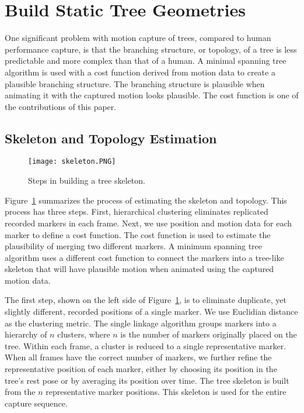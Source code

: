 \section{Build Static Tree Geometries} 

One significant problem with motion capture of trees, compared to human performance capture, is that the branching structure, or topology, of a tree is less predictable and more complex than that of a human.  A minimal spanning tree algorithm is used with a cost function derived from motion data to create a plausible branching structure.  The branching structure is plausible when animating it with the captured motion looks plausible. The cost function is one of the contributions of this paper.  

\subsection{Skeleton and Topology Estimation} 

\begin{figure}[tb]
\centering
\texttt{[image: skeleton.PNG]}
\caption{Steps in building a tree skeleton.}
\label{fig:Skeleton} 
\end{figure}

Figure~\ref{fig:Skeleton} summarizes the process of estimating the skeleton and topology. This process has three steps. First, hierarchical clustering eliminates replicated recorded markers in each frame. Next, we use position and motion data for each marker to define a cost function.  The cost function is used to estimate the plausibility of merging two different markers. A minimum spanning tree algorithm uses a different cost function to connect the markers into a tree-like skeleton that will have plausible motion when animated using the captured motion data.

The first step, shown on the left side of Figure~\ref{fig:Skeleton}, is to eliminate duplicate, yet slightly different, recorded positions of a single marker.  We use Euclidian distance as the clustering metric. The single linkage algorithm groups markers into a hierarchy of $n$ clusters, where $n$ is the number of markers originally placed on the tree.  Within each frame, a cluster is reduced to a single representative marker.  When all frames have the correct number of markers, we further refine the representative position of each marker, either by choosing its position in the tree's rest pose or by averaging its position over time. The tree skeleton is built from the $n$ representative marker positions.  This skeleton is used for the entire capture sequence.

